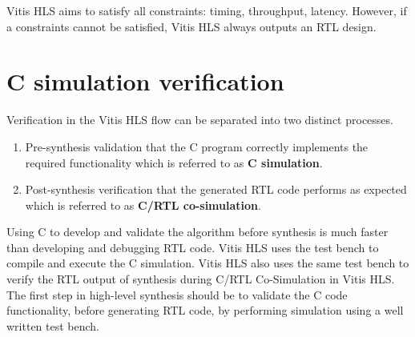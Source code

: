 \par Vitis HLS aims to satisfy all constraints: timing, throughput, latency. However, if a constraints cannot be satisfied, Vitis HLS always outputs an RTL design.

\clearpage
\section{C simulation verification}
Verification in the Vitis HLS flow can be separated into two distinct processes.
\begin{enumerate}
  \item Pre-synthesis validation that the C program correctly implements the required functionality which is referred to as \textbf{C simulation}.
  \item Post-synthesis verification that the generated RTL code performs as expected which is referred to as \textbf{C/RTL co-simulation}.
\end{enumerate}

Using C to develop and validate the algorithm before synthesis is much faster than developing and debugging RTL code. Vitis HLS uses the test bench to compile and execute the C simulation. Vitis HLS also uses the same test bench to verify the RTL output of synthesis during C/RTL Co-Simulation in Vitis HLS. The first step in high-level synthesis should be to validate the C code functionality, before generating RTL code, by performing simulation using a well written test bench.
  
